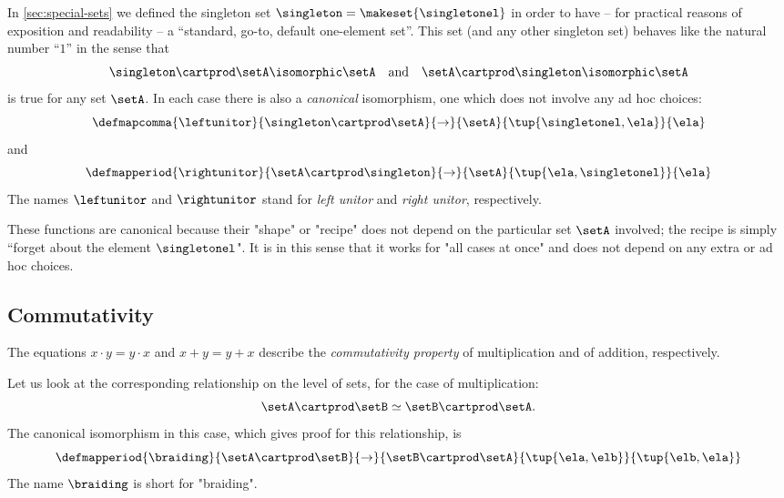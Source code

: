 In \cref{sec:special-sets} we defined the singleton set $\singleton = \makeset{\singletonel}$ in order to have -- for practical reasons of exposition and readability -- a ``standard, go-to, default one-element set''.  This set (and any other singleton set) behaves like the natural number ``$1$'' in the sense that
\begin{equation}
\singleton \cartprod \setA \isomorphic \setA \quad \text{and} \quad \setA \cartprod \singleton \isomorphic \setA
\end{equation}
is true for any set $\setA$. In each case there is also a \emph{canonical} isomorphism, one which does not involve any ad hoc choices:
\begin{equation}
 \defmapcomma{
           \leftunitor
        }{
            \singleton \cartprod \setA
        }{
            \to
        }{
            \setA
        }{
            \tup{\singletonel, \ela}
        }{
            \ela
        }
\end{equation}
and
\begin{equation}
 \defmapperiod{
           \rightunitor
        }{
            \setA \cartprod \singleton  
        }{
            \to
        }{
            \setA
        }{
            \tup{\ela, \singletonel}
        }{
            \ela
        }
\end{equation}
The names $\leftunitor$ and $\rightunitor$ stand for \emph{left unitor} and \emph{right unitor}, respectively. 
 
These functions are canonical because their "shape" or "recipe" does not depend on the particular set $\setA$ involved; the recipe is simply ``forget about the element $\singletonel$". 
It is in this sense that it works for "all cases at once" and does not depend on any extra or ad hoc choices.  

\subsection{Commutativity}
   
The equations $x \cdot y = y \cdot x$ and $x + y = y + x$ describe the \emph{commutativity property} of multiplication and of addition, respectively. 

Let us look at the corresponding relationship on the level of sets, for the case of multiplication:
\begin{equation}
\setA \cartprod \setB \simeq \setB \cartprod \setA. 
\end{equation}
The canonical isomorphism in this case, which gives proof for this relationship, is
 \begin{equation}
 \defmapperiod{
           \braiding
        }{
            \setA \cartprod \setB
        }{
            \to
        }{
            \setB \cartprod \setA
        }{
            \tup{\ela, \elb}
        }{
            \tup{\elb, \ela}
        }
\end{equation}
The name $\braiding$ is short for "braiding". 


